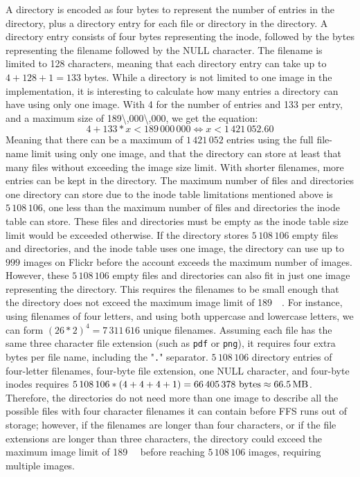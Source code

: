 A directory is encoded as four bytes to represent the number of entries in the directory, plus a directory entry for each file or directory in the directory. A directory entry consists of four bytes representing the inode, followed by the bytes representing the filename followed by the NULL character. The filename is limited to 128 characters, meaning that each directory entry can take up to $ 4 + 128 + 1 = 133$ bytes. While a directory is not limited to one image in the implementation, it is interesting to calculate how many entries a directory can have using only one image. With \SI{4}{\byte} for the number of entries and \SI{133}{\byte} per entry, and a maximum size of \SI{189\,000\,000}{\byte}, we get the equation:
$$
	4 + 133 * x < 189\,000\,000 \Longleftrightarrow x < 1\,421\,052.60
$$
Meaning that there can be a maximum of $1\,421\,052$ entries using the full file-name limit using only one image, and that the directory can store at least that many files without exceeding the image size limit. With shorter filenames, more entries can be kept in the directory. The maximum number of files and directories one directory can store due to the inode table limitations mentioned above is $5\,108\,106$, one less than the maximum number of files and directories the inode table can store. These files and directories must be empty as the inode table size limit would be exceeded otherwise. If the directory stores $5\,108\,106$ empty files and directories, and the inode table uses one image, the directory can use up to $999$ images on Flickr before the account exceeds the maximum number of images. However, these $5\,108\,106$ empty files and directories can also fit in just one image representing the directory. This requires the filenames to be small enough that the directory does not exceed the maximum image limit of \SI{189}{\mega\byte}. For instance, using filenames of four letters, and using both uppercase and lowercase letters, we can form $(26*2)^4 = 7\,311\,616$ unique filenames. Assuming each file has the same three character file extension (such as \texttt{pdf} or \texttt{png}), it requires four extra bytes per file name, including the "\texttt{.}" separator. $5\,108\,106$ directory entries of \mbox{four-letter} filenames, \mbox{four-byte} file extension, one NULL character, and \mbox{four-byte} inodes requires $5\,108\,106 * (4 + 4 + 4 + 1) = 66\,405\,378\text{ bytes} \approx \text{\SI{66.5}{\mega\byte}}$. Therefore, the directories do not need more than one image to describe all the possible files with four character filenames it can contain before \gls{FFS} runs out of storage; however, if the filenames are longer than four characters, or if the file extensions are longer than three characters, the directory could exceed the maximum image limit of \SI{189}{\mega\byte} before reaching $5\,108\,106$ images, requiring multiple images.

